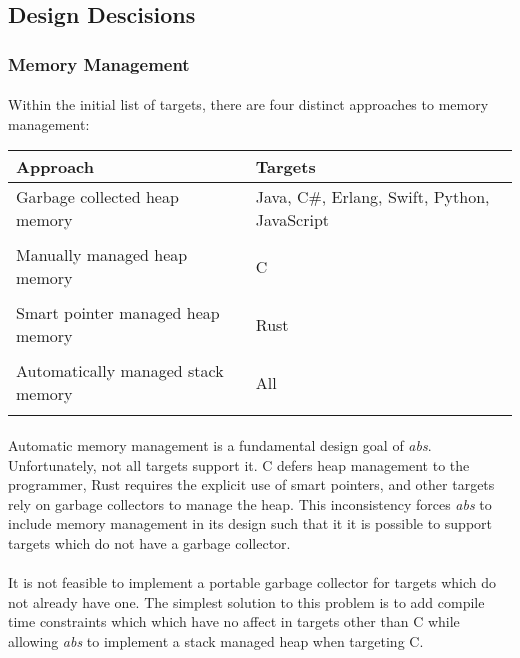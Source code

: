 \documentclass[hidelinks]{article}
\begin{document}
\subsection{Design Descisions}
\subsubsection{Memory Management}
\paragraph{}Within the initial list of targets, there are four distinct approaches to memory management: 
\begin{longtable}{ |p{4cm}|p{11cm}|  }
\hline
\textbf{Approach} & \textbf{Targets} \\
\hline
Garbage collected heap memory & Java, C\#, Erlang, Swift, Python, JavaScript\\
&\\
\hline
Manually managed heap memory & C\\
&\\
\hline
Smart pointer managed heap memory & Rust\\
&\\
\hline
Automatically managed stack memory & All\\ 
&\\
\hline
\end{longtable}
\paragraph{}Automatic memory management is a fundamental design goal of \textit{abs}. Unfortunately, not all targets support it. C defers heap management to the programmer, Rust requires the explicit use of smart pointers, and other targets rely on garbage collectors to manage the heap. This inconsistency forces \textit{abs} to include memory management in its design such that it it is possible to support targets which do not have a garbage collector.

\paragraph{}It is not feasible to implement a portable garbage collector for targets which do not already have one. The simplest solution to this problem is to add compile time constraints which which have no affect in targets other than C while allowing \textit{abs} to implement a stack managed heap when targeting C.
\end{document}
